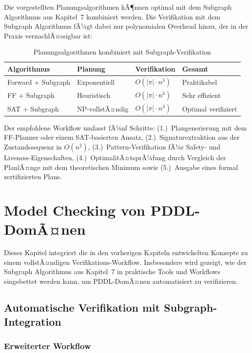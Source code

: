 ﻿\documentclass[a4paper,12pt]{article}
\theoremstyle{definition}
\begin{document}
Die vorgestellten Planungsalgorithmen kÃ¶nnen optimal mit dem Subgraph Algorithmus aus Kapitel~7 kombiniert werden. Die Verifikation mit dem Subgraph Algorithmus fÃ¼gt dabei nur polynomialen Overhead hinzu, der in der Praxis vernachlÃ¤ssigbar ist:

\begin{table}[h]
	\centering
	\caption{Planungsalgorithmen kombiniert mit Subgraph-Verifikation}
	\label{tab:planner_with_verification}
	\begin{tabular}{llll}
		\toprule
		Algorithmus & Planung & Verifikation & Gesamt \\
		\midrule
		Forward + Subgraph & Exponentiell & $O(|\pi| \cdot n^3)$ & Praktikabel \\
		FF + Subgraph & Heuristisch & $O(|\pi| \cdot n^3)$ & Sehr effizient \\
		SAT + Subgraph & NP-vollstÃ¤ndig & $O(|\pi| \cdot n^3)$ & Optimal verifiziert \\
		\bottomrule
	\end{tabular}
\end{table}

Der empfohlene Workflow umfasst fÃ¼nf Schritte: (1.)~Plangenerierung mit dem FF-Planner oder einem SAT-basierten Ansatz, (2.)~Signaturextraktion aus der Zustandssequenz in $O(n^2)$, (3.)~Pattern-Verifikation fÃ¼r Safety- und Liveness-Eigenschaften, (4.)~OptimalitÃ¤tsprÃ¼fung durch Vergleich der PlanlÃ¤nge mit dem theoretischen Minimum sowie (5.)~Ausgabe eines formal zertifizierten Plans.

\section{Model Checking von PDDL-DomÃ¤nen}

Dieses Kapitel integriert die in den vorherigen Kapiteln entwickelten Konzepte zu einem vollstÃ¤ndigen Verifikations-Workflow. Insbesondere wird gezeigt, wie der Subgraph Algorithmus aus Kapitel~7 in praktische Tools und Workflows eingebettet werden kann, um PDDL-DomÃ¤nen automatisiert zu verifizieren.

\subsection{Automatische Verifikation mit Subgraph-Integration}

\subsubsection{Erweiterter Workflow}
\end{document}
